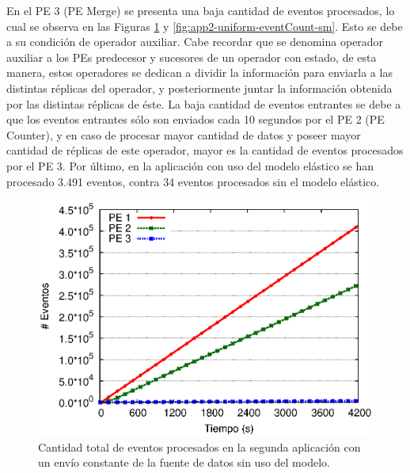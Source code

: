 En el PE 3 (PE Merge) se presenta una baja cantidad de eventos procesados, lo cual se observa en las Figuras \ref{fig:app2-uniform-eventCount-cm} y \ref{fig:app2-uniform-eventCount-sm}. Esto se debe a su condición de operador auxiliar. Cabe recordar que se denomina operador auxiliar a los PEs predecesor y sucesores de un operador con estado, de esta manera, estos operadores se dedican a dividir la información para enviarla a las distintas réplicas del operador, y posteriormente juntar la información obtenida por las distintas réplicas de éste. La baja cantidad de eventos entrantes se debe a que los eventos entrantes sólo son enviados cada 10 segundos por el PE 2 (PE Counter), y en caso de procesar mayor cantidad de datos y poseer mayor cantidad de réplicas de este operador, mayor es la cantidad de eventos procesados por el PE 3. Por último, en la aplicación con uso del modelo elástico se han procesado 3.491 eventos, contra 34 eventos procesados sin el modelo elástico.

\begin{figure}[!ht]
\centering
    \includegraphics[scale=0.7]{images/exp/app2/uniform/cm/eventCount.eps}
    \caption{Cantidad total de eventos procesados en la segunda aplicación con un envío constante de la fuente de datos sin uso del modelo.}
    \label{fig:app2-uniform-eventCount-cm}
\end{figure}

